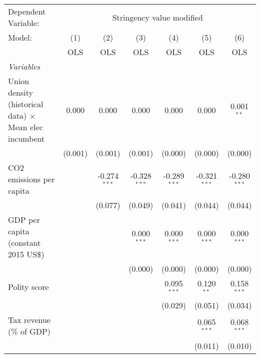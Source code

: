 
\begingroup
\centering
\begin{tabular}{lcccccc}
   \toprule
   Dependent Variable: & \multicolumn{6}{c}{Stringency value modified}\\
   Model:                                                        & (1)     & (2)            & (3)            & (4)            & (5)            & (6)\\  
                                                                 &  OLS    & OLS            & OLS            & OLS            & OLS            & OLS\\  
   \midrule
   \emph{Variables}\\
   Union density (historical data) $\times$ Mean elec incumbent  & 0.000   & 0.000          & 0.000          & 0.000          & 0.000          & 0.001$^{**}$\\   
                                                                 & (0.001) & (0.001)        & (0.001)        & (0.000)        & (0.000)        & (0.000)\\   
   CO2 emissions per capita                                      &         & -0.274$^{***}$ & -0.328$^{***}$ & -0.289$^{***}$ & -0.321$^{***}$ & -0.280$^{***}$\\   
                                                                 &         & (0.077)        & (0.049)        & (0.041)        & (0.044)        & (0.044)\\   
   GDP per capita (constant 2015 US\$)                           &         &                & 0.000$^{***}$  & 0.000$^{***}$  & 0.000$^{***}$  & 0.000$^{***}$\\   
                                                                 &         &                & (0.000)        & (0.000)        & (0.000)        & (0.000)\\   
   Polity score                                                  &         &                &                & 0.095$^{***}$  & 0.120$^{**}$   & 0.158$^{***}$\\   
                                                                 &         &                &                & (0.029)        & (0.051)        & (0.034)\\   
   Tax revenue (\% of GDP)                                       &         &                &                &                & 0.065$^{***}$  & 0.068$^{***}$\\   
                                                                 &         &                &                &                & (0.011)        & (0.010)\\   

\end{tabular}
